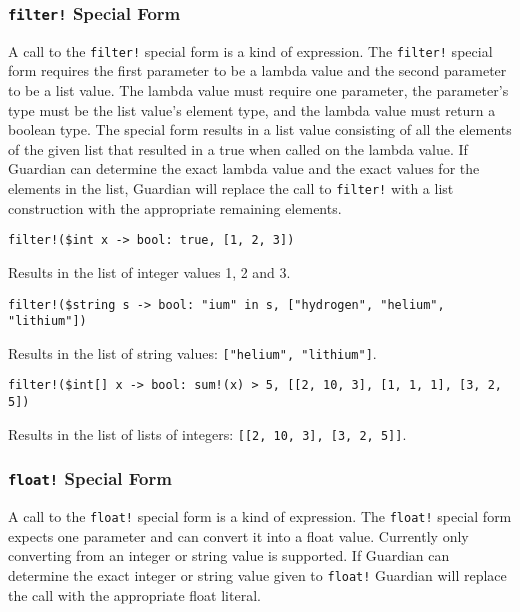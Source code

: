 {	\subsubsection{\texttt{filter!} Special Form}
	{
		A call to the \texttt{filter!} special form is a kind of expression.
		The \texttt{filter!} special form requires the first parameter to be
		a lambda value and the second parameter to be a list value.
		The lambda value must require one parameter, the parameter's type must
		be the list value's element type, and the lambda value must return a
		boolean type.
		The special form results in a list value consisting of all the elements
		of the given list that resulted in a true when called on the lambda
		value.
		If Guardian can determine the exact lambda value and the exact
		values for the elements in the list, Guardian will replace the call
		to \texttt{filter!} with a list construction with the appropriate
		remaining elements.
		
		\begin{itemize}
		{
			\item[] \texttt{filter!(\$int x -> bool: true, [1, 2, 3])}
			
				Results in the list of integer values 1, 2 and 3.
			
			\item[] \texttt{filter!(\$string s -> bool: "ium" in s, ["hydrogen", "helium", "lithium"])}
			
				Results in the list of string
				values: \texttt{["helium", "lithium"]}.
			
			\item[] \texttt{filter!(\$int[] x -> bool: sum!(x) > 5, [[2, 10, 3], [1, 1, 1], [3, 2, 5])}
				
				Results in the list of lists of
				integers: \texttt{[[2, 10, 3], [3, 2, 5]]}.
		}
		\end{itemize}
	}
	
	\subsubsection{\texttt{float!} Special Form}
	{
		A call to the \texttt{float!} special form is a kind of expression.
		The \texttt{float!} special form expects one parameter and can convert it
		into a float value. Currently only converting from an integer or string
		value is supported.
		If Guardian can determine the exact integer or string value given to
		\texttt{float!} Guardian will replace the call with the appropriate
		float literal.
		
}}
